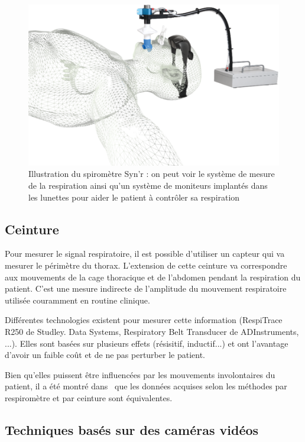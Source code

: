 \begin{figure}[h!]
	\begin{center}
		\includegraphics[width=12cm]{images/spiro}
	\end{center}
	\caption[Illustration du spiromètre Syn'r]{Illustration du spiromètre Syn'r : on peut voir le système de mesure de la respiration ainsi qu'un système de moniteurs implantés dans les lunettes pour aider le patient à contrôler sa respiration} 
	\label{fig:spirometre}
\end{figure}

\subsection{Ceinture}

Pour mesurer le signal respiratoire, il est possible d'utiliser un capteur qui va mesurer le périmètre du thorax. L'extension de cette ceinture va correspondre aux mouvements de la cage thoracique et de l'abdomen pendant la respiration du patient. C'est une mesure indirecte de l'amplitude du mouvement respiratoire utilisée couramment en routine clinique. 

Différentes technologies existent pour mesurer cette information (RespiTrace R250 de Studley. Data Systems, Respiratory Belt Transducer de ADInstruments, ...). Elles sont basées sur plusieurs effets (résisitif, inductif...) et ont l'avantage d'avoir un faible coût et de ne pas perturber le patient.

Bien qu'elles puissent être influencées par les mouvements involontaires du patient, il a été montré dans~\cite{Guivarch2004Sync} que les données acquises selon les méthodes par respiromètre et par ceinture sont équivalentes.

\subsection{Techniques basés sur des caméras vidéos}

